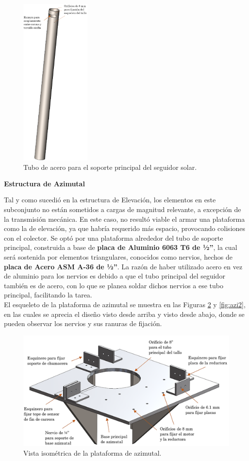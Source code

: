 \begin{figure}[H]
	\centering
	\includegraphics[width=3.5cm]{imagenes/tal6}
	\caption{Tubo de acero para el soporte principal del seguidor solar.}
	\label{fig:tal6}
\end{figure}

\textbf{Estructura de Azimutal}

Tal y como sucedió en la estructura de Elevación, los elementos en este subconjunto no están sometidos a cargas de magnitud relevante, a excepción de la transmisión mecánica. En este caso, no resultó viable el armar una plataforma como la de elevación, ya que habría requerido más espacio, provocando colisiones con el colector. Se optó por una plataforma alrededor del tubo de soporte principal, construida a base de \textbf{placa de Aluminio 6063 T6 de ½”}, la cual será sostenida por elementos triangulares, conocidos como nervios, hechos de \textbf{placa de Acero ASM A-36 de ½”}. La razón de haber utilizado acero en vez de aluminio para los nervios es debido a que el tubo principal del seguidor también es de acero, con lo que se planea soldar dichos nervios a ese tubo principal, facilitando la tarea.\\

El esqueleto de la plataforma de azimutal se muestra en las Figuras \ref{fig:azi1} y \ref{fig:azi2}, en las cuales se aprecia el diseño visto desde arriba y visto desde abajo, donde se pueden observar los nervios y sus ranuras de fijación.

\begin{figure}[H]
	\centering
	\includegraphics[width=\columnwidth]{imagenes/azi1}
	\caption{Vista isométrica de la plataforma de azimutal.}
	\label{fig:azi1}
\end{figure}

